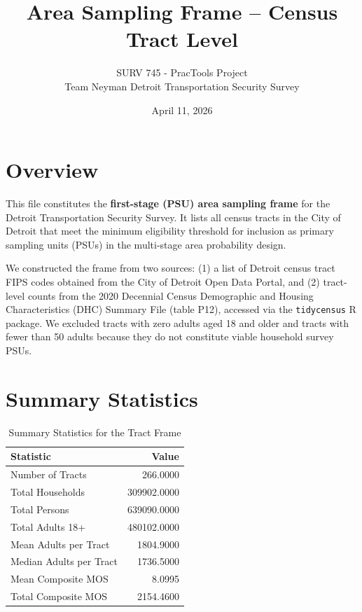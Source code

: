 \documentclass[
  11pt,
]{article}
\title{Area Sampling Frame -- Census Tract Level}
\subtitle{SURV 745 - PracTools Project\\
Team Neyman \textbar{} Detroit Transportation Security Survey}
\author{}
\date{\vspace{-2.5em}April 11, 2026}
\begin{document}
\maketitle

\section{Overview}\label{overview}

This file constitutes the \textbf{first-stage (PSU) area sampling frame}
for the Detroit Transportation Security Survey. It lists all census
tracts in the City of Detroit that meet the minimum eligibility
threshold for inclusion as primary sampling units (PSUs) in the
multi-stage area probability design.

We constructed the frame from two sources: (1) a list of Detroit census
tract FIPS codes obtained from the City of Detroit Open Data Portal, and
(2) tract-level counts from the 2020 Decennial Census Demographic and
Housing Characteristics (DHC) Summary File (table P12), accessed via the
\texttt{tidycensus} R package. We excluded tracts with zero adults aged
18 and older and tracts with fewer than 50 adults because they do not
constitute viable household survey PSUs.

\section{Summary Statistics}\label{summary-statistics}

\begin{table}[!h]
\centering
\caption{\label{tab:summary-stats}Summary Statistics for the Tract Frame}
\centering
\fontsize{10}{12}\selectfont
\begin{tabular}[t]{lr}
\toprule
Statistic & Value\\
\midrule
Number of Tracts & 266.0000\\
Total Households & 309902.0000\\
Total Persons & 639090.0000\\
Total Adults 18+ & 480102.0000\\
Mean Adults per Tract & 1804.9000\\
Median Adults per Tract & 1736.5000\\
Mean Composite MOS & 8.0995\\
Total Composite MOS & 2154.4600\\
\bottomrule
\end{tabular}
\end{table}
\end{document}
